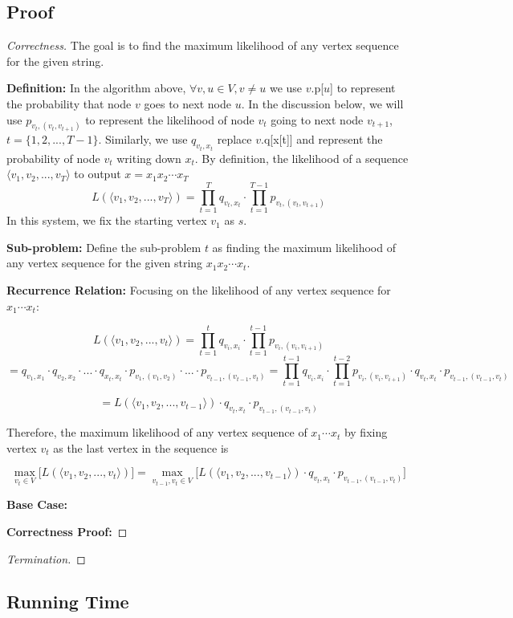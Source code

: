 \documentclass[openany]{article}
\begin{document}
\subsection*{Proof}
\begin{proof}[Correctness]{} The goal is to find the maximum likelihood of any vertex sequence for the given string.

\textbf{Definition:} In the algorithm above,  $\forall v,u\in V, v\neq u$ we use $v$.p[$u$] to represent the probability that node $v$ goes to next node $u$. In the discussion below, we will use $p_{v_t,(v_t,v_{t+1})}$ to represent the likelihood of node $v_t$ going to next node $v_{t+1}$, $ t=\{1,2,...,T-1\}$. Similarly, we use $q_{v_t,x_t}$ replace $v.$q[x[t]] and represent the probability of node $v_t$ writing down $x_t$. 
By definition, the likelihood of a sequence $\langle v_1,v_2,...,v_T \rangle$ to output $x=x_1x_2\cdots x_T$
\[L(\langle v_1,v_2,...,v_T \rangle) = \prod_{t=1}^{T}q_{v_t,x_t} \cdot \prod_{t=1}^{T-1}p_{v_t,(v_t,v_{t+1})}  \]
In this system, we fix the starting vertex $v_1$ as $s$.
    
\textbf{Sub-problem:} Define the sub-problem $t$ as finding the maximum likelihood of any vertex sequence for the given string $x_1x_2\cdots x_t$.
    
\textbf{Recurrence Relation:} Focusing on the likelihood of any vertex sequence for $x_1\cdots x_t$:

\[L(\langle v_1,v_2,...,v_t \rangle)=
\prod_{t=1}^{t}q_{v_i,x_i} \cdot \prod_{t=1}^{t-1}p_{v_i,(v_i,v_{i+1})}\]
\[=q_{v_1,x_1}\cdot q_{v_2,x_2} \cdot ... \cdot q_{x_t, x_t} \cdot p_{v_1,(v_1, v_2)} \cdot ...\cdot p_{v_{t-1},(v_{t-1}, v_{t})}=\prod_{t=1}^{t-1}q_{v_i,x_i} \cdot \prod_{t=1}^{t-2}p_{v_i,(v_i,v_{i+1})} \cdot q_{v_t,x_t} \cdot p_{v_{t-1},(v_{t-1},v_t)}\]

\[= L(\langle v_1,v_2,...,v_{t-1} \rangle)\cdot q_{v_t,x_t} \cdot p_{v_{t-1},(v_{t-1},v_t)} \]

Therefore, the maximum likelihood of any vertex sequence of $x_1\cdots x_t$ by fixing vertex $v_t$ as the last vertex in the sequence is

\[\mathop{\max}_{v_t\in V} \Bigg[ L(\langle v_1,v_2,...,v_{t} \rangle) \Bigg] = \mathop{\max}_{v_{t-1},v_t\in V} \Bigg[ L(\langle v_1,v_2,...,v_{t-1} \rangle) \cdot q_{v_t,x_t} \cdot p_{v_{t-1},(v_{t-1},v_t)} \Bigg] \]


\textbf{Base Case:}
    
    
\textbf{Correctness Proof:}

    
  

\end{proof}
\begin{proof}[Termination]{}

\end{proof}

\subsection*{Running Time}
\end{document}
